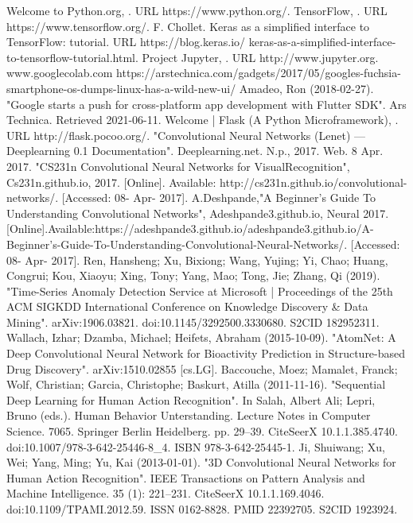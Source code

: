 \documentclass[11pt]{report}
\begin{document}
\begin{thebibliography}{100}
	 Welcome to Python.org, . URL https://www.python.org/.
	 TensorFlow, . URL https://www.tensorflow.org/.
	 F. Chollet. Keras as a simplified interface to TensorFlow: tutorial. URL https://blog.keras.io/
	keras-as-a-simplified-interface-to-tensorflow-tutorial.html.
	 Project Jupyter, . URL http://www.jupyter.org.
	 www.googlecolab.com
	 https://arstechnica.com/gadgets/2017/05/googles-fuchsia-smartphone-os-dumps-linux-has-a-wild-new-ui/
	  Amadeo, Ron (2018-02-27). "Google starts a push for cross-platform app development with Flutter SDK". Ars Technica. Retrieved 2021-06-11.
	 Welcome | Flask (A Python Microframework), . URL http://flask.pocoo.org/.
	 "Convolutional Neural Networks (Lenet) — Deeplearning 0.1 Documentation". Deeplearning.net. N.p.,
	2017. Web. 8 Apr. 2017.
	 "CS231n Convolutional Neural Networks for VisualRecognition", Cs231n.github.io, 2017. [Online].
	Available: http://cs231n.github.io/convolutional-networks/. [Accessed: 08- Apr- 2017].
	 A.Deshpande,"A Beginner's Guide To Understanding Convolutional Networks", Adeshpande3.github.io, Neural 2017.
	[Online].Available:https://adeshpande3.github.io/adeshpande3.github.io/A-Beginner's-Guide-To-Understanding-Convolutional-Neural-Networks/. [Accessed: 08- Apr- 2017].
	 Ren, Hansheng; Xu, Bixiong; Wang, Yujing; Yi, Chao; Huang, Congrui; Kou, Xiaoyu; Xing, Tony; Yang, Mao; Tong, Jie; Zhang, Qi (2019). "Time-Series Anomaly Detection Service at Microsoft | Proceedings of the 25th ACM SIGKDD International Conference on Knowledge Discovery \& Data Mining". arXiv:1906.03821. doi:10.1145/3292500.3330680. S2CID 182952311.
	 Wallach, Izhar; Dzamba, Michael; Heifets, Abraham (2015-10-09). "AtomNet: A Deep Convolutional Neural Network for Bioactivity Prediction in Structure-based Drug Discovery". arXiv:1510.02855 [cs.LG].
	 Baccouche, Moez; Mamalet, Franck; Wolf, Christian; Garcia, Christophe; Baskurt, Atilla (2011-11-16). "Sequential Deep Learning for Human Action Recognition". In Salah, Albert Ali; Lepri, Bruno (eds.). Human Behavior Unterstanding. Lecture Notes in Computer Science. 7065. Springer Berlin Heidelberg. pp. 29–39. CiteSeerX 10.1.1.385.4740. doi:10.1007/978-3-642-25446-8\_4. ISBN 978-3-642-25445-1.
	 Ji, Shuiwang; Xu, Wei; Yang, Ming; Yu, Kai (2013-01-01). "3D Convolutional Neural Networks for Human Action Recognition". IEEE Transactions on Pattern Analysis and Machine Intelligence. 35 (1): 221–231. CiteSeerX 10.1.1.169.4046. doi:10.1109/TPAMI.2012.59. ISSN 0162-8828. PMID 22392705. S2CID 1923924.

\end{thebibliography}
\end{document}
